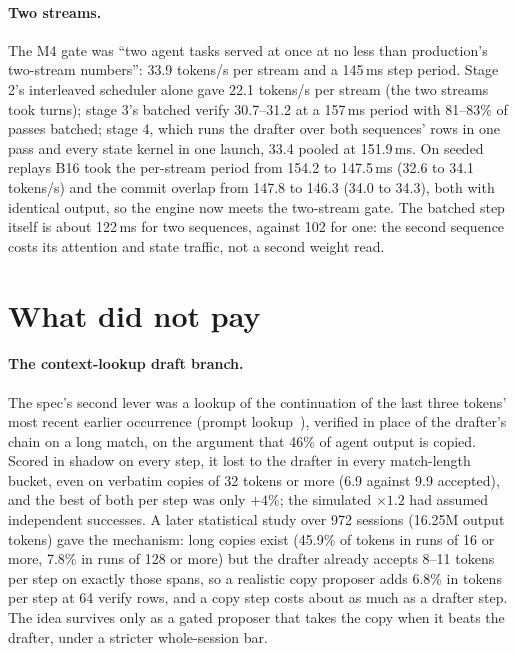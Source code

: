 \documentclass[11pt]{article}
\begin{document}
\paragraph{Two streams.}
The M4 gate was ``two agent tasks served at once at no less than production's two-stream numbers'': 33.9 tokens/s per
stream and a 145\,ms step period. Stage 2's interleaved scheduler alone gave 22.1 tokens/s per stream (the two streams
took turns); stage 3's batched verify 30.7--31.2 at a 157\,ms period with 81--83\% of passes batched; stage 4, which runs
the drafter over both sequences' rows in one pass and every state kernel in one launch, 33.4 pooled at 151.9\,ms. On
seeded replays B16 took the per-stream period from 154.2 to 147.5\,ms (32.6 to 34.1 tokens/s) and the commit overlap
from 147.8 to 146.3 (34.0 to 34.3), both with identical output, so the engine now meets the two-stream gate. The batched
step itself is about 122\,ms for two sequences, against 102 for one: the second sequence costs its attention and state
traffic, not a second weight read.

\section{What did not pay}
\label{sec:negative}

\paragraph{The context-lookup draft branch.}
The spec's second lever was a lookup of the continuation of the last three tokens' most recent earlier occurrence (prompt lookup~\cite{saxena2023pld,he2023rest,lan2023copy}), verified
in place of the drafter's chain on a long match, on the argument that 46\% of agent output is copied. Scored in shadow on
every step, it lost to the drafter in every match-length bucket, even on verbatim copies of 32 tokens or more (6.9
against 9.9 accepted), and the best of both per step was only $+4\%$; the simulated $\times1.2$ had assumed independent
successes. A later statistical study over 972 sessions (16.25M output tokens) gave the mechanism: long copies exist
(45.9\% of tokens in runs of 16 or more, 7.8\% in runs of 128 or more) but the drafter already accepts 8--11 tokens per
step on exactly those spans, so a realistic copy proposer adds 6.8\% in tokens per step at 64 verify rows, and a copy
step costs about as much as a drafter step. The idea survives only as a gated proposer that takes the copy when it beats
the drafter, under a stricter whole-session bar.
\end{document}
